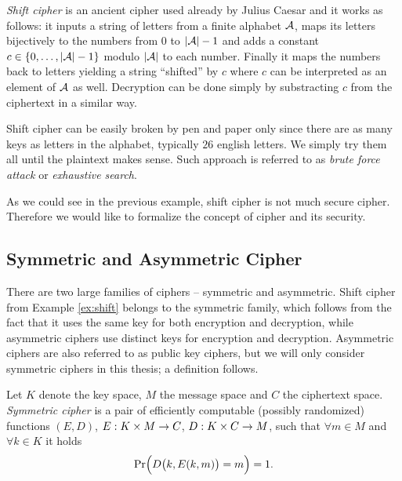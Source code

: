 \begin{example}
\label{ex:shift}
	{\em Shift cipher} is an ancient cipher used already by Julius Caesar and it works as follows: it inputs a string of letters from a finite alphabet $\cal A$, maps its letters bijectively to the numbers from $0$ to $|{\cal A}|-1$ and adds a constant $c\in\{0 , \ldots , |{\cal A}|-1\}$ modulo $|\cal A|$ to each number. Finally it maps the numbers back to letters yielding a string ``shifted'' by $c$ where $c$ can be interpreted as an element of $\cal A$ as well. Decryption can be done simply by substracting $c$ from the ciphertext in a similar way.
	
	Shift cipher can be easily broken by pen and paper only since there are as many keys as letters in the alphabet, typically $26$ english letters. We simply try them all until the plaintext makes sense. Such approach is referred to as {\em brute force attack} or {\em exhaustive search}.
\end{example}

As we could see in the previous example, shift cipher is not much secure cipher. Therefore we would like to formalize the concept of cipher and its security.



\subsection{Symmetric and Asymmetric Cipher}

There are two large families of ciphers -- symmetric and asymmetric. Shift cipher from Example \ref{ex:shift} belongs to the symmetric family, which follows from the fact that it uses the same key for both encryption and decryption, while asymmetric ciphers use distinct keys for encryption and decryption. Asymmetric ciphers are also referred to as public key ciphers, but we will only consider symmetric ciphers in this thesis; a definition follows.

\begin{defn}
\label{def:symcipher}
	Let $K$ denote the key space, $M$ the message space and $C$ the ciphertext space. {\em Symmetric cipher} is a pair of efficiently computable (possibly randomized) functions $(E,D)$, $E:K\times M\rightarrow C$, $D:K\times C\rightarrow M$, such that $\forall m\in M$ and $\forall k\in K$ it holds   %
	\begin{equation}
	\label{eq:correct}
		\Pr\Bigl(D\bigl(k,E(k,m)\bigr)=m\Bigr) = 1 .
	\end{equation}
\end{defn}

